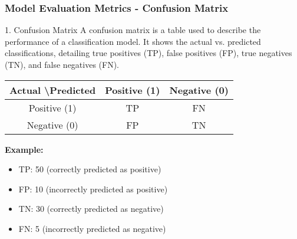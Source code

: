 \documentclass[aspectratio=169]{beamer}
\begin{document}
\begin{frame}[fragile]
    \frametitle{Model Evaluation Metrics - Confusion Matrix}
    \begin{block}{1. Confusion Matrix}
        A confusion matrix is a table used to describe the performance of a classification model. It shows the actual vs. predicted classifications, detailing true positives (TP), false positives (FP), true negatives (TN), and false negatives (FN).
        
        \begin{center}
        \begin{tabular}{|c|c|c|}
            \hline
            Actual \textbackslash Predicted & Positive (1) & Negative (0) \\
            \hline
            Positive (1) & TP & FN \\
            \hline
            Negative (0) & FP & TN \\
            \hline
        \end{tabular}
        \end{center}

        \textbf{Example:}
        \begin{itemize}
            \item TP: 50 (correctly predicted as positive)
            \item FP: 10 (incorrectly predicted as positive)
            \item TN: 30 (correctly predicted as negative)
            \item FN: 5 (incorrectly predicted as negative)
        \end{itemize}
    \end{block}
\end{frame}
\end{document}
